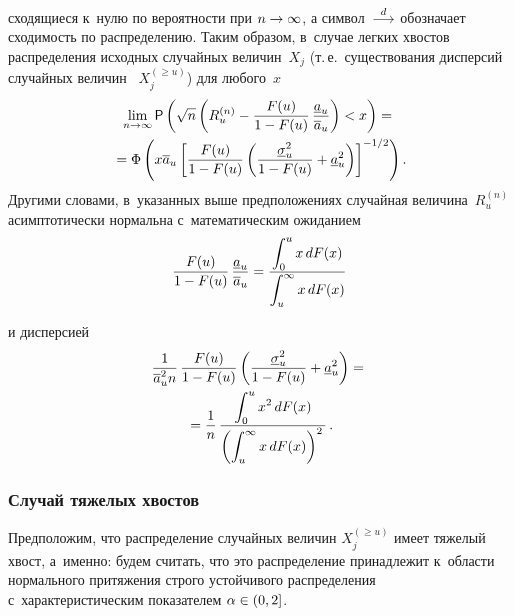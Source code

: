 \begin{multicols}{2}
сходящиеся к~нулю по вероятности при $n\hm\to\infty$, а символ~$\tod$ 
обозначает сходимость по распределению. Таким образом, в~случае
 легких хвостов распределения исходных случайных величин~$X_j$ (т.\,е.\
  существования дисперсий случайных величин~ $X_j^{(\ge u)}$) для любого~$x$
\begin{multline*}
\lim\limits_{n\to\infty}{\sf P}\left(
\sqrt{n}\left(R_u^{(n)}-\fr{F(u)}{1-F(u)}\,
\fr{\underline{a}_u}{\overline{a}_u}\right)<x\right)={}\\
{}=
\Phi\left( x \overline{a}_u\left[\fr{F(u)}{1-F(u)}\left(
\fr{\underline{\sigma}^2_u}{1-F(u)}+
\underline{a}^2_u\right)\right]^{-1/2}\right).
\end{multline*}
Другими словами, в~указанных выше предположениях случайная 
величина~$R_u^{(n)}$ асимптотически нормальна с~математическим ожиданием
$$
\fr{F(u)}{1-F(u)}\, \fr{\underline{a}_u}{\overline{a}_u}=
\fr{\int\nolimits_{0}^{u}x\,dF(x)}{\int\nolimits_{u}^{\infty}x\,dF(x)}
$$

\vspace*{-9pt}

\pagebreak

\noindent
и дисперсией
\begin{multline*}
\fr{1}{\overline{a}_u^2n}\,\fr{F(u)}{1-F(u)}
\left(\fr{\underline{\sigma}^2_u}{1-F(u)}+
\underline{a}^2_u\right)={}\\
{}=\fr{1}{n}\,\fr{\int\nolimits_{0}^{u}
x^2\,dF(x)}{\left(\int\nolimits_{u}^{\infty}x\,dF(x)\right)^2}\,.
\end{multline*}

\subsubsection{Случай тяжелых хвостов}

Предположим, что распределение случайных величин $X_j^{(\ge u)}$ 
имеет тяжелый хвост, а~именно: будем считать, что это распределение 
принадлежит к~области нормального притяжения строго устойчивого 
распределения с~характеристическим показателем $\alpha\hm\in(0,2]$.


\end{multicols}
